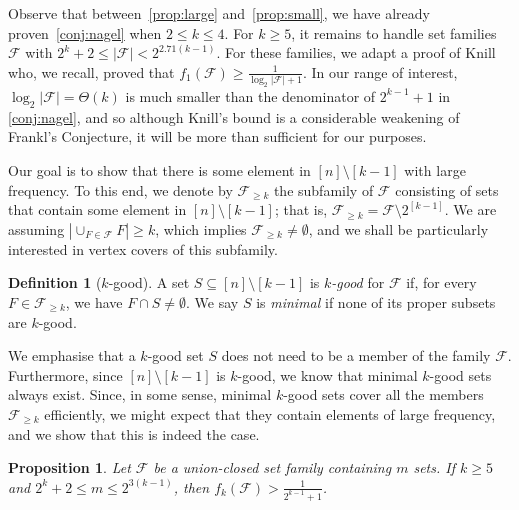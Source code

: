 \documentclass[a4paper,12pt]{article}
\theoremstyle{mystyle}	%
\newtheorem{proposition}[theorem]{Proposition}
\theoremstyle{definition}
\newtheorem{definition}[theorem]{Definition}
\newcommand{\F}{\mathcal{F}}
\newcommand{\6}{\partial}
\begin{document}
Observe that between~\cref{prop:large} and~\cref{prop:small}, we have already proven~\cref{conj:nagel} when $2 \le k \le 4$. For $k \ge 5$, it remains to handle set families $\mathcal{F}$ with $2^k + 2 \le | \mathcal{F} | < 2^{2.71(k-1)}$. For these families, we adapt a proof of Knill~\cite{knill1994graph} who, we recall, proved that $f_1(\F) \ge \frac{1}{\log_2 |\F| + 1 }$. In our range of interest, $\log_2 |\F| = \Theta(k)$ is much smaller than the denominator of $2^{k-1} + 1$ in \cref{conj:nagel}, and so although Knill's bound is a considerable weakening of Frankl's Conjecture, it will be more than sufficient for our purposes.

Our goal is to show that there is some element in $[n] \setminus [k-1]$ with large frequency. To this end, we denote by $\F_{\ge k}$ the subfamily of $\F$ consisting of sets that contain some element in $[n] \setminus [k-1]$; that is, $\F_{\ge k} = \F \setminus 2^{[k-1]}$. We are assuming $|\cup_{F \in \F} F| \ge k$, which implies $\F_{\ge k} \neq \emptyset$, and we shall be particularly interested in vertex covers of this subfamily.

\begin{definition}[$k$-good]
    A set $S \subseteq [n] \setminus [k-1]$ is \emph{$k$-good} for $\F$ if, for every $F \in \F_{\ge k}$, we have $F \cap S \neq \emptyset$. We say $S$ is \emph{minimal} if none of its proper subsets are $k$-good.
\end{definition}

We emphasise that a $k$-good set $S$ does not need to be a member of the family $\F$. Furthermore, since $[n] \setminus [k-1]$ is $k$-good, we know that minimal $k$-good sets always exist. Since, in some sense, minimal $k$-good sets cover all the members $\mathcal{F}_{\ge k}$ efficiently, we might expect that they contain elements of large frequency, and we show that this is indeed the case.

\begin{proposition}\label{prop:medium}
Let $\mathcal{F}$ be a union-closed set family containing $m$ sets. If $k\geq 5$ and $2^k+2\leq m\leq 2^{3(k-1)}$, then $f_k(\mathcal{F})> \frac{1}{2^{k-1}+1}$.
\end{proposition}
\end{document}

